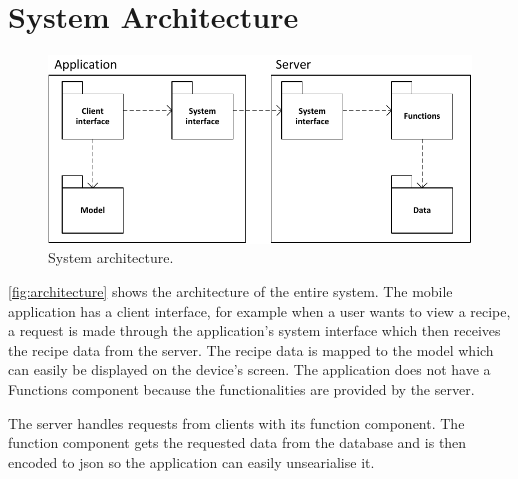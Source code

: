 \section{System Architecture}

\begin{figure}[H]
\centering
\includegraphics[width=0.9\linewidth]{img/components.pdf}
\caption{System architecture.}
\label{fig:architecture}
\end{figure}

\autoref{fig:architecture} shows the architecture of the entire system. The mobile application has a client interface, for example when a user wants to view a recipe, a request is made through the application's system interface which then receives the recipe data from the server. The recipe data is mapped to the model which can easily be displayed on the device's screen. The application does not have a Functions component because the functionalities are provided by the server.

The server handles requests from clients with its function component. The function component gets the requested data from the database and is then encoded to \ac{json} so the application can easily unsearialise it.